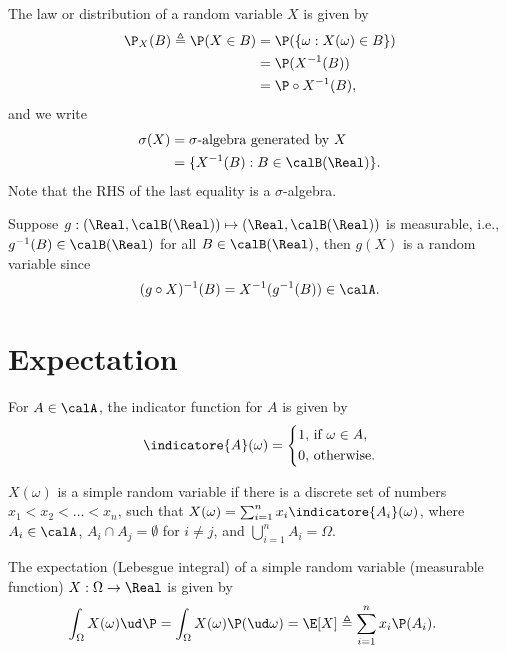 \documentclass[../aipt.tex]{subfiles}
\begin{document}
The law or distribution of a random variable $X$ is given by
\begin{align*}
\P_{X}(B)\triangleq \P(X\in B)
&= \P(\{\omega : X(\omega) \in B\}) \\
&= \P(X^{-1}(B)) \\
&= \P\circ X^{-1}(B),
\end{align*}
and we write
\begin{align*}
\sigma(X) 
&= \text{$\sigma$-algebra generated by $X$} \\
&= \{X^{-1}(B) : B \in \calB(\Real)\}.
\end{align*}
Note that the RHS of the last equality is a $\sigma$-algebra.

Suppose $g:(\Real, \calBR) \mapsto (\Real, \calBR)$ is measurable, i.e., $g^{-1}(B)\in\calBR$ for all $B\in\calBR$, then $g(X)$ is a random variable since 
\begin{align*}
(g \circ X)^{-1}(B)=X^{-1}(g^{-1}(B))\in \calA.
\end{align*}


\section{Expectation}\label{sec:Expectation}

For $A\in\calA$, the indicator function for $A$ is given by 
\begin{align}
\indicatore{A}(\omega)=\left\{
\begin{aligned}
1,\ &	 \text{if } \omega \in A, \\
0,\  & 	\text{otherwise}.
\end{aligned}
\right.
\end{align}

\begin{Definition}
$X(\omega)$ is a simple random variable if there is a discrete set of numbers $x_1<x_2< \ldots<x_n$, such that $X(\omega)= \sum_{i=1}^n{x_i} \indicatore{A_i}(\omega)$, where $A_i\in\calA$, $A_{i}\cap A_{j}= \emptyset$ for $i \neq j$, and $\bigcup_{i=1}^n{A_{i}} = \Omega$.
\end{Definition}


\begin{Definition}\label{wk4:def:expectation}
The expectation (Lebesgue integral) of a simple random variable (measurable function) $X: \Omega \to \Real$ is given by
\begin{align*}
\int_{\Omega} X(\omega) \ud\P
& = \int_{\Omega} X(\omega) \P(\ud\omega) 
= \E[X] 
\triangleq \sum_{i=1}^n{x_i \P(A_i)}.
\end{align*}
\end{Definition}
\end{document}
